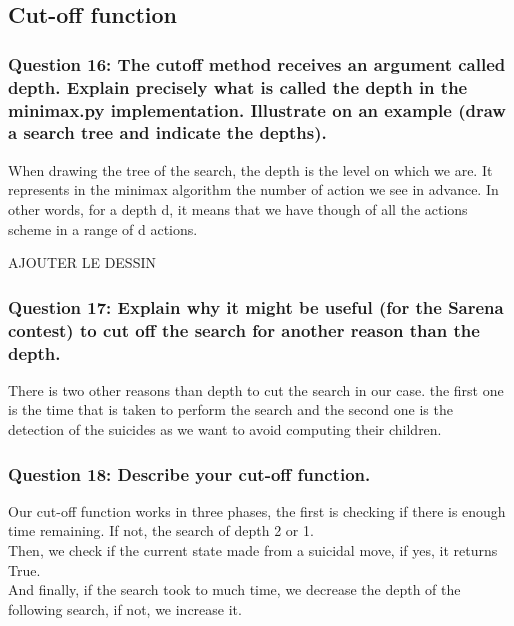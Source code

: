 \documentclass[a4paper,10pt]{article}
\begin{document}
			\subsection{Cut-off function}
				\subsubsection{Question 16: The cutoff method receives an argument called depth. Explain precisely what is called the depth in the minimax.py implementation. Illustrate on an example (draw a search tree and indicate the depths).}
					When drawing the tree of the search, the depth is the level on which we are. It represents in the minimax algorithm the number of action we see in advance. In other words, for a depth d, it means that we have though of all the actions scheme in a range of d actions.\\
					\begin{huge}
						AJOUTER LE DESSIN
					\end{huge}
				\subsubsection{Question 17: Explain why it might be useful (for the Sarena contest) to cut off the search for another reason than the depth.}
					There is two other reasons than depth to cut the search in our case. the first one is the time that is taken to perform the search and the second one is the detection of the suicides as we want to avoid computing their children.
				\subsubsection{Question 18: Describe your cut-off function.}
					Our cut-off function works in three phases, the first is checking if there is enough time remaining. If not, the search of depth 2 or 1.\\
					Then, we check if the current state made from a suicidal move, if yes, it returns True.\\
					And finally, if the search took to much time, we decrease the depth of the following search, if not, we increase it.
\end{document}
